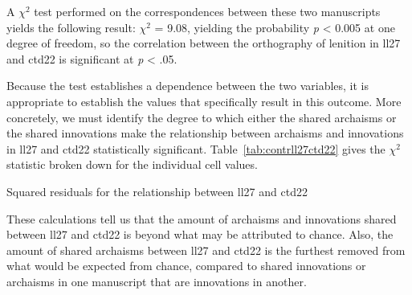 
A \(\chi^2\) test performed on the correspondences between these two manuscripts yields the following result: \(\chi^2\) = 9.08, yielding the probability \emph{p} < 0.005 at one degree of freedom, so the correlation between the orthography of lenition in \gls{ll27} and \gls{ctd22} is  significant at \textit{p} < .05.

Because the test establishes a dependence between the two variables, it is appropriate to establish the values that specifically result in  this outcome. More concretely, we must identify the degree to which either the shared archaisms or the shared innovations  make the relationship between archaisms and innovations in \gls{ll27} and \gls{ctd22} statistically significant. Table~\ref{tab:contrll27ctd22} gives the \(\chi^2\) statistic broken down for the individual cell values.

\begin{table}[h]
  \centering
  
  \caption{Squared residuals for the relationship between \acrshort{ll27} and \acrshort{ctd22}}
  \label{tab:contrll27ctd22}
\end{table}

These calculations tell us that the amount of archaisms and innovations shared between \gls{ll27} and \gls{ctd22} is beyond what may be attributed to chance. Also, the amount of shared archaisms between \gls{ll27} and \gls{ctd22} is the furthest removed from what would be expected from chance, compared to shared innovations or archaisms in one manuscript that are innovations in another.

